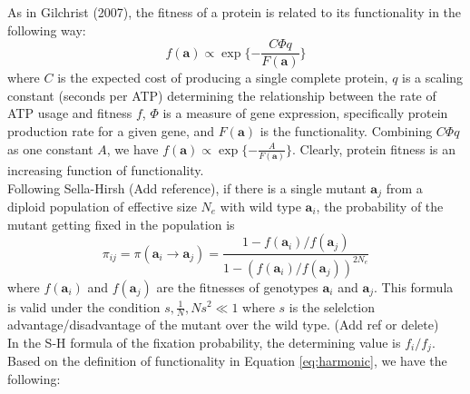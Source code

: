 \documentclass[13pt]{article}
\begin{document}
As in Gilchrist (2007), the fitness of a protein is related to its functionality in the following way:
\[f(\mathbf{a}) \propto \exp\{-\frac{C\Phi q}{F(\mathbf{a})}\}\]
where $C$ is the expected cost of producing a single complete protein, $q$ is a scaling constant (seconds per ATP) determining the relationship between the rate of ATP usage and fitness $f$, $\Phi$ is a measure of gene expression, specifically protein production rate for a given gene, and $F(\mathbf{a})$ is the functionality.
Combining $C\Phi q$ as one constant $A$, we have
$f(\mathbf{a}) \propto \exp\{-\frac{A}{F(\mathbf{a})}\}$.
Clearly, protein fitness is an increasing function of functionality.\\

Following Sella-Hirsh (Add reference), if there is a single mutant $\mathbf{a}_j$ from a diploid population of effective size $N_e$ with wild type $\mathbf{a}_i$, the probability of the mutant getting fixed in the population is 
\begin{equation}
\pi_{ij} = \pi(\mathbf{a}_i \rightarrow \mathbf{a}_j ) = \frac{1-f(\mathbf{a}_i)/f(\mathbf{a}_j)}{1-(f(\mathbf{a}_i)/f(\mathbf{a}_j))^{2N_e}}
\label{eq:fixation}
\end{equation}
where $f(\mathbf{a}_i)$ and $f(\mathbf{a}_j)$ are the fitnesses of genotypes $\mathbf{a}_i$ and $\mathbf{a}_j$. This formula is valid under the condition $s, \frac{1}{N}, Ns^2 \ll 1$ where $s$ is the selelction advantage/disadvantage of the mutant over the wild type. (Add ref or delete)\\

%
%




In the S-H formula of the fixation probability, the determining value is $f_i/f_j$.
Based on the definition of functionality in Equation \ref{eq:harmonic}, we have the following:
\end{document}
